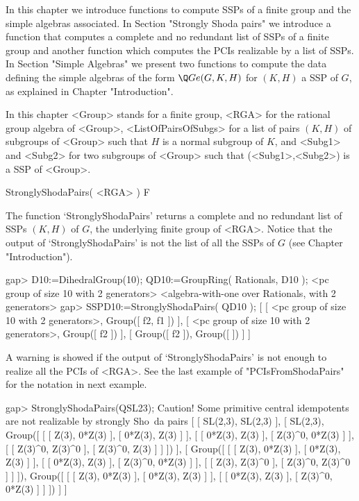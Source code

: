 
In this chapter we introduce functions to compute SSPs of a finite group and the simple 
algebras associated. In Section "Strongly Shoda pairs" we introduce a function that computes a 
complete and no redundant list of SSPs of a finite group and another function which computes 
the PCIs realizable by a list of SSPs. In Section "Simple Algebras" we present two functions 
to compute the data defining the simple algebras of the form $\Q Ge(G,K,H)$ for $(K,H)$ a SSP 
of $G$, as explained in Chapter "Introduction". 

In this chapter <Group> stands for a finite group, <RGA> for the rational group algebra of 
<Group>, <ListOfPairsOfSubgs> for a list of pairs $(K,H)$ of subgroups of <Group> such 
that $H$ is a normal subgroup of $K$, and <Subg1> and <Subg2> for two subgroups of <Group> 
such that (<Subg1>,<Subg2>) is a SSP of <Group>. 

 


\>StronglyShodaPairs( <RGA> ) F

The function `StronglyShodaPairs' returns a complete and no redundant list of SSPs $(K,H)$ of 
$G$, the underlying finite group of <RGA>. Notice that the output of `StronglyShodaPairs' is 
not the list of all the SSPs of $G$ (see Chapter "Introduction"). 

\beginexample
    gap> D10:=DihedralGroup(10); QD10:=GroupRing( Rationals, D10 );
    <pc group of size 10 with 2 generators>
    <algebra-with-one over Rationals, with 2 generators>
    gap> SSPD10:=StronglyShodaPairs( QD10 );
    [ [ <pc group of size 10 with 2 generators>, Group([ f2, f1 ]) ],
    [ <pc group of size 10 with 2 generators>, Group([ f2 ]) ],
    [ Group([ f2 ]), Group([  ]) ] ]
\endexample

A warning is showed if the output of `StronglyShodaPairs' is not enough to realize all the 
PCIs of <RGA>. See the last example of "PCIsFromShodaPairs" for the notation in next example. 

\beginexample
    gap> StronglyShodaPairs(QSL23);
    Caution! Some primitive central idempotents are not realizable by strongly Sho\
    da pairs
    [ [ SL(2,3), SL(2,3) ],
    [ SL(2,3), Group([ [ [ Z(3), 0*Z(3) ], [ 0*Z(3), Z(3) ] ],
            [ [ 0*Z(3), Z(3) ], [ Z(3)^0, 0*Z(3) ] ],
            [ [ Z(3)^0, Z(3)^0 ], [ Z(3)^0, Z(3) ] ] ]) ],
    [ Group([ [ [ Z(3), 0*Z(3) ], [ 0*Z(3), Z(3) ] ],
            [ [ 0*Z(3), Z(3) ], [ Z(3)^0, 0*Z(3) ] ],
            [ [ Z(3), Z(3)^0 ], [ Z(3)^0, Z(3)^0 ] ] ]),
        Group([ [ [ Z(3), 0*Z(3) ], [ 0*Z(3), Z(3) ] ],
            [ [ 0*Z(3), Z(3) ], [ Z(3)^0, 0*Z(3) ] ] ]) ] ]
\endexample



